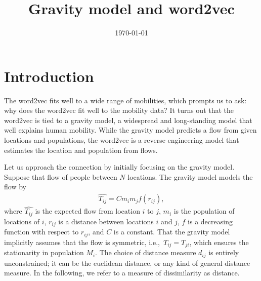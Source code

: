 \documentclass[12pt]{article} %
\def\ie{i.e.,~}
\begin{document}

\title{Gravity model and word2vec} %
\date{\today}
\maketitle %

\section{Introduction}\label{sec:introduction}

The word2vec fits well to a wide range of mobilities, which prompts us to ask: why does the word2vec fit well to the mobility data?
It turns out that the word2vec is tied to a gravity model, a widespread and long-standing model that well explains human mobility.
While the gravity model predicts a flow from given locations and populations, the word2vec is a reverse engineering model that estimates the location and population from flows.

Let us approach the connection by initially focusing on the gravity model.
Suppose that flow of people between $N$ locations. The gravity model models the flow by
\begin{align}
    \hat{T_{ij}} = C m_i m_j f(r_{ij}), \label{eq:gravity_model}
\end{align}
where $\hat{T_{ij}}$ is the expected flow from location $i$ to $j$, $m_i$ is the population of locations of $i$, $r_{ij}$ is a distance between locations $i$ and $j$, $f$ is a decreasing function with respect to $r_{ij}$, and $C$ is a constant.
That the gravity model implicitly assumes that the flow is symmetric, \ie $T_{ij}=T_{ji}$, which ensures the stationarity in population $M_{i}$.
The choice of distance measure $d_{ij}$ is entirely unconstrained; it can be the euclidean distance, or any kind of general distance measure.
In the following, we refer to a measure of dissimilarity as distance.
\end{document}

